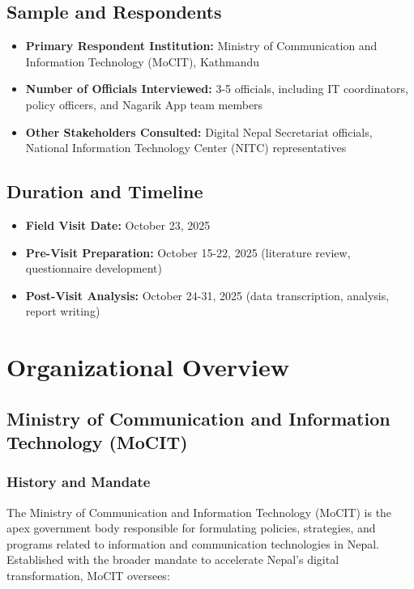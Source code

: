 \documentclass[12pt,a4paper]{article}
\begin{document}
\subsection{Sample and Respondents}

\begin{itemize}
    \item \textbf{Primary Respondent Institution:} Ministry of Communication and Information Technology (MoCIT), Kathmandu
    \item \textbf{Number of Officials Interviewed:} 3-5 officials, including IT coordinators, policy officers, and Nagarik App team members
    \item \textbf{Other Stakeholders Consulted:} Digital Nepal Secretariat officials, National Information Technology Center (NITC) representatives
\end{itemize}

\subsection{Duration and Timeline}

\begin{itemize}
    \item \textbf{Field Visit Date:} October 23, 2025
    \item \textbf{Pre-Visit Preparation:} October 15-22, 2025 (literature review, questionnaire development)
    \item \textbf{Post-Visit Analysis:} October 24-31, 2025 (data transcription, analysis, report writing)
\end{itemize}

\newpage
\section{Organizational Overview}
\label{sec:organization}

\subsection{Ministry of Communication and Information Technology (MoCIT)}

\subsubsection{History and Mandate}

The Ministry of Communication and Information Technology (MoCIT) is the apex government body responsible for formulating policies, strategies, and programs related to information and communication technologies in Nepal. Established with the broader mandate to accelerate Nepal's digital transformation, MoCIT oversees:
\end{document}
